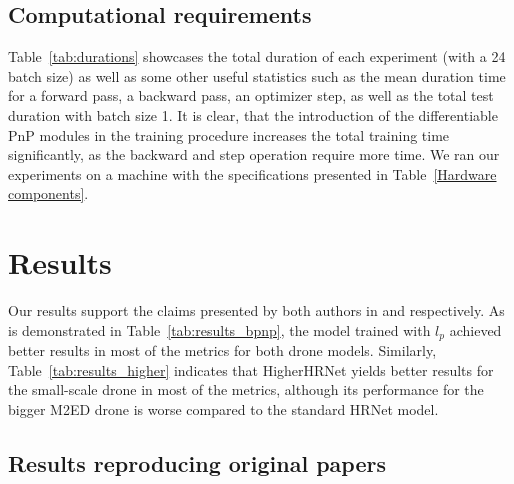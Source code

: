 \subsection{Computational requirements}
Table~\ref{tab:durations} showcases the total duration of each experiment (with a 24 batch size) as well as some other useful statistics such as the mean duration time for a forward pass, a backward pass, an optimizer step, as well as the total test duration with batch size 1. 
It is clear, that the introduction of the differentiable PnP modules in the training procedure increases the total training time significantly, as the backward and step operation require more time.
We ran our experiments on a machine with the specifications presented in Table~\ref{Hardware components}.



\section{Results}
\label{sec:results}
Our results support the claims presented by both authors in \cite{chen2020end} and \cite{cheng2020higherhrnet} respectively. 
As is demonstrated in Table~\ref{tab:results_bpnp}, the model trained with $l_p$ achieved better results in most of the metrics for both drone models. 
Similarly, Table~\ref{tab:results_higher} indicates that HigherHRNet yields better results for the small-scale drone in most of the metrics, although its performance for the bigger M2ED drone is worse compared to the standard HRNet model.
%
\subsection{Results reproducing original papers}
